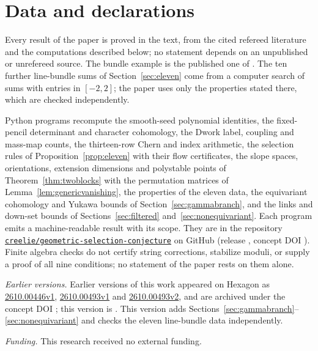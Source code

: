 \section*{Data and declarations}
Every result of the paper is proved in the text, from the cited refereed
literature and the computations described below; no statement depends on
an unpublished or unrefereed source. The bundle example is the published
one of \cite{BCL}. The ten further line-bundle sums of
Section~\ref{sec:eleven} come from a computer search of sums with
entries in $[-2,2]$; the paper uses only the properties stated there,
which are checked independently.

Python programs recompute the smooth-seed polynomial identities, the
fixed-pencil determinant and character cohomology, the Dwork label,
coupling and mass-map counts, the thirteen-row Chern and index arithmetic,
the selection rules of Proposition~\ref{prop:eleven} with their flow
certificates, the slope spaces, orientations, extension dimensions and
polystable points of Theorem~\ref{thm:twoblocks} with the permutation
matrices of Lemma~\ref{lem:genericvanishing}, the properties of the
eleven data, the equivariant cohomology and Yukawa bounds of
Section~\ref{sec:gammabranch}, and the links and down-set bounds of
Sections~\ref{sec:filtered} and~\ref{sec:nonequivariant}. Each program emits a machine-readable result with its scope.
They are in the repository
\href{https://github.com/creelie/geometric-selection-conjecture}{\texttt{creelie/geometric-selection-conjecture}} on GitHub (release
\ownrelease{}, concept DOI \href{https://doi.org/\ownconceptdoi}{\ownconceptdoi}).
Finite algebra checks do not certify string corrections, stabilize moduli,
or supply a proof of all nine conditions; no statement of the paper rests
on them alone.

\smallskip\noindent\textit{Earlier versions.} Earlier versions of this
work appeared on Hexagon as
\href{https://hexagonmath.org/2610.00446v1}{2610.00446v1},
\href{https://hexagonmath.org/2610.00493v1}{2610.00493v1} and
\href{https://hexagonmath.org/2610.00493v2}{2610.00493v2}, and are
archived under the concept DOI
\href{https://doi.org/\ownconceptdoi}{\ownconceptdoi}\ifx\ownversiondoi\empty\else;
this version is
\href{https://doi.org/\ownversiondoi}{\ownversiondoi}\fi. This version
adds Sections~\ref{sec:gammabranch}--\ref{sec:nonequivariant} and checks
the eleven line-bundle data independently.

\smallskip\noindent\textit{Funding.} This research received no external
funding.

